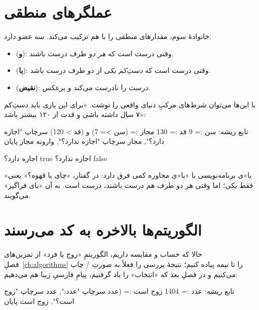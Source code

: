 \section{عملگرهای منطقی}

خانوادهٔ سوم، مقدارهای منطقی را با هم ترکیب می‌کند. سه عضو دارد:

\begin{itemize}
  \item {} (\textbf{و}): وقتی درست است که \emph{هر دو} طرف درست
        باشند.
  \item {} (\textbf{یا}): وقتی درست است که \emph{دستِ‌کم یکی} از دو
        طرف درست باشد.
  \item {} (\textbf{نقیض}): درست را نادرست می‌کند و برعکس.
\end{itemize}

با این‌ها می‌توان شرط‌های مرکبِ دنیای واقعی را نوشت. «برای این بازی باید
دستِ‌کم ۷ سال داشته باشی و قدت از ۱۲۰ بیشتر باشد»:

\begin{salamfa}
تابع ریشه:
    سن := 9
    قد := 130
    مجاز := (سن >= 7) و (قد > 120)
    سرچاپ "اجازه دارد؟", مجاز
    سرچاپ "اجازه ندارد؟", وارونه مجاز
پایان
\end{salamfa}

\begin{progoutfa}
اجازه دارد؟ true
اجازه ندارد؟ false
\end{progoutfa}

\begin{note}
«یا»ی برنامه‌نویسی با «یا»ی محاوره کمی فرق دارد: در گفتار، «چای یا قهوه؟»
یعنی فقط یکی؛ اما  وقتی هر دو طرف هم درست باشند، درست است. به آن
«یای فراگیر» می‌گویند.
\end{note}

\section{الگوریتم‌ها بالاخره به کد می‌رسند}

حالا که حساب و مقایسه داریم، الگوریتمِ «زوج یا فرد» از تمرین‌های فصلِ~\ref{ch:algorithms} را تا نیمه پیاده کنیم؛ نتیجهٔ بررسی را فعلاً به صورتِ
/ چاپ می‌کنیم و در فصلِ بعد که «انتخاب» را یاد
گرفتیم، پیامِ فارسیِ زیبا هم می‌دهیم:

\begin{salamfa}
تابع ریشه:
    عدد := 1404
    زوج است := (عدد %
    سرچاپ "عدد:", عدد
    سرچاپ "زوج است؟", زوج است
پایان
\end{salamfa}

